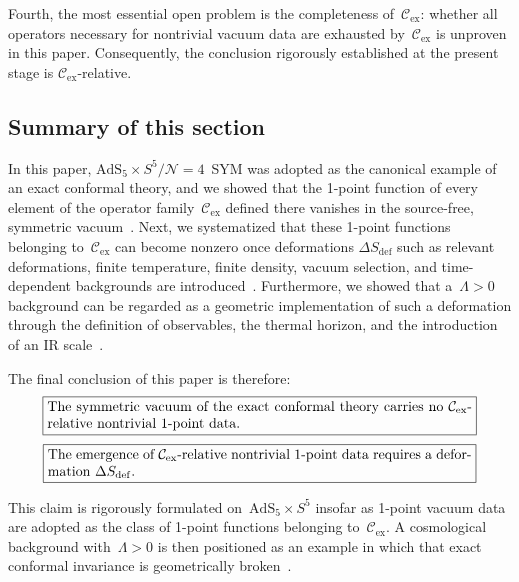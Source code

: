 \documentclass[
  aps,
  prd,
  preprint,
  groupedaddress,
  nofootinbib,
  longbibliography
]{revtex4-2}
\theoremstyle{remark}
\newcommand{\Cex}{\mathcal{C}_{\mathrm{ex}}}
\newcommand{\N}{\mathcal{N}}
\newcommand{\AdS}{\mathrm{AdS}}
\begin{document}
Fourth, the most essential open problem is the completeness
of~$\Cex$: whether all operators necessary for nontrivial vacuum
data are exhausted by~$\Cex$ is unproven in this paper.
Consequently, the conclusion rigorously established at the
present stage is $\Cex$-relative.

\subsection{Summary of this section}\label{subsec:5-9}

In this paper, $\AdS_5\times S^5/\N=4$~SYM was adopted as
the canonical example of an exact conformal theory, and we showed
that the 1-point function of every element of the operator
family~$\Cex$ defined there vanishes in the source-free, symmetric
vacuum~\cite{ref1,ref2,ref3,ref4,ref5,ref6,ref7,ref8,ref9,ref10,
  ref11,ref12,ref13,ref14}.
Next, we systematized that these 1-point functions belonging
to~$\Cex$ can become nonzero once deformations
$\Delta S_{\mathrm{def}}$ such as relevant deformations, finite
temperature, finite density, vacuum selection, and time-dependent
backgrounds are
introduced~\cite{ref3,ref4,ref9,ref10,ref11,ref12}.
Furthermore, we showed that a~$\Lambda>0$ background can be
regarded as a geometric implementation of such a deformation
through the definition of observables, the thermal horizon,
and the introduction of an IR
scale~\cite{ref15,ref16,ref17,ref18,ref19,ref20,ref21,
  ref22,ref23,ref24,ref25,ref26,ref27}.

The final conclusion of this paper is therefore:
\begin{equation}\label{eq:box1}
  \fbox{\parbox{0.88\columnwidth}{%
    The symmetric vacuum of the exact conformal theory
    carries no $\Cex$-relative nontrivial 1-point data.}}
\end{equation}
\begin{equation}\label{eq:box2}
  \fbox{\parbox{0.88\columnwidth}{%
    The emergence of $\Cex$-relative nontrivial 1-point
    data requires a deformation~$\Delta S_{\mathrm{def}}$.}}
\end{equation}

This claim is rigorously formulated on~$\AdS_5\times S^5$
insofar as 1-point vacuum data are adopted as the class of
1-point functions belonging to~$\Cex$.
A cosmological background with~$\Lambda>0$ is then positioned
as an example in which that exact conformal invariance is
geometrically
broken~\cite{ref15,ref16,ref17,ref18,ref19,ref20,ref21,
  ref22,ref23,ref24,ref25,ref26,ref27}.
\end{document}
